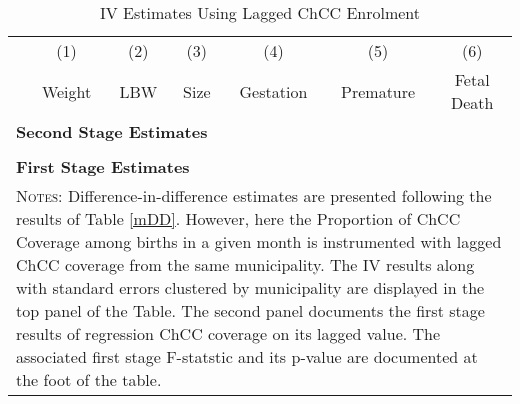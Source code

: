 \documentclass[12pt]{article}
\begin{document}
\begin{spacing}{1.4}
\begin{table}
  \begin{center}
    \caption{IV Estimates Using Lagged ChCC Enrolment}
    \label{tab:ChCC_IV}
    \begin{tabular}{lcccccc} \toprule 
      & (1)    & (2) & (3)  & (4)       & (5)       & (6)         \\
      & Weight & LBW & Size & Gestation & Premature & Fetal Death \\ \midrule
      \multicolumn{7}{l}{\textbf{Second Stage Estimates}} \\
       \\
      \multicolumn{7}{l}{\textbf{First Stage Estimates}} \\
      
      \midrule
      \multicolumn{7}{p{17.4cm}}{{\footnotesize \textsc{Notes}:
          Difference-in-difference estimates are presented following the
          results of Table \ref{mDD}.  However, here the Proportion of ChCC
          Coverage among births in a given month is instrumented with
          lagged ChCC coverage from the same municipality.  The
          IV results along with standard errors clustered by municipality
          are displayed in the top panel of the Table.  The second panel
          documents the first stage results of regression ChCC coverage
          on its lagged value.  The associated first stage F-statstic and its
          p-value are documented at the foot of the table.
      }} \\ \bottomrule
    \end{tabular}
  \end{center}
\end{table}


\end{spacing}
\end{document}
